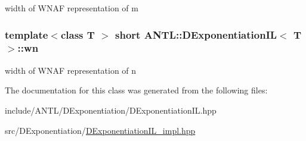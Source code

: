 width of W\-N\-A\-F representation of m \hypertarget{classANTL_1_1DExponentiationIL_a159d7e6f874fcb3223f4aa4b6f5b3f78}{
\subsubsection[{wn}]{\setlength{\rightskip}{0pt plus 5cm}template$<$class T $>$ short {\bf A\-N\-T\-L\-::\-D\-Exponentiation\-I\-L}$<$ T $>$\-::wn\hspace{0.3cm}{\ttfamily [protected]}}}\label{classANTL_1_1DExponentiationIL_a159d7e6f874fcb3223f4aa4b6f5b3f78}
width of W\-N\-A\-F representation of n 

The documentation for this class was generated from the following files\-:\begin{DoxyCompactItemize}
\item 
include/\-A\-N\-T\-L/\-D\-Exponentiation/D\-Exponentiation\-I\-L.\-hpp\item 
src/\-D\-Exponentiation/\hyperlink{DExponentiationIL__impl_8hpp}{D\-Exponentiation\-I\-L\-\_\-impl.\-hpp}\end{DoxyCompactItemize}
